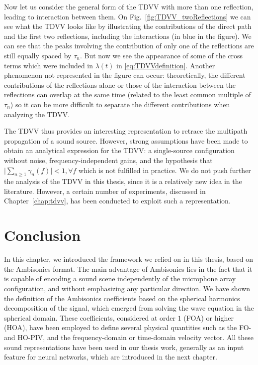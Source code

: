 Now let us consider the general form of the TDVV with more than one reflection, leading to interaction between them. On Fig.~\ref{fig:TDVV_twoReflections} we can see what the TDVV looks like by illustrating the contributions of the direct path and the first two reflections, including the interactions (in blue in the figure). We can see that the peaks involving the contribution of only one of the reflections are still equally spaced by $\tau_n$. But now we see the appearance of some of the cross terms which were included in $\lambda(t)$ in \eqref{eq:TDVVdefinition}. Another phenomenon not represented in the figure can occur: theoretically, the different contributions of the reflections alone or those of the interaction between the reflections can overlap at the same time (related to the least common multiple of $\tau_n$) so it can be more difficult to separate the different contributions when analyzing the TDVV.

The TDVV thus provides an interesting representation to retrace the multipath propagation of a sound source. However, strong assumptions have been made to obtain an analytical expression for the TDVV: a single-source configuration without noise, frequency-independent gains, and the hypothesis that $\lvert \sum_{n \geq 1} \gamma_n(f) \rvert < 1, \forall f$ which is not fulfilled in practice. We do not push further the analysis of the TDVV in this thesis, since it is a relatively new idea in the literature. However, a certain number of experiments, discussed in Chapter~\ref{chap:tdvv}, has been conducted to exploit such a representation.


\section{Conclusion}

In this chapter, we introduced the framework we relied on in this thesis, based on the Ambisonics format. The main advantage of Ambisonics lies in the fact that it is capable of encoding a sound scene independently of the microphone array configuration, and without emphasizing any particular direction. We have shown the definition of the Ambisonics coefficients based on the spherical harmonics decomposition of the signal, which emerged from solving the wave equation in the spherical domain. These coefficients, considered at order $1$ (FOA) or higher (HOA), have been employed to define several physical quantities such as the FO- and HO-PIV, and the frequency-domain or time-domain velocity vector. All these sound representations have been used in our thesis work, generally as an input feature for neural networks, which are introduced in the next chapter.
